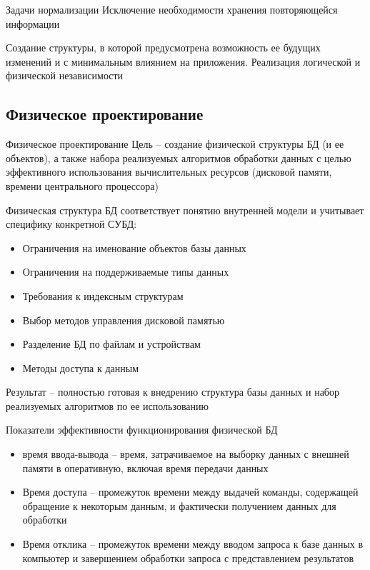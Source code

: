 \documentclass[12pt]{article}
\begin{document}
\begin{nota}{Задачи нормализации}
    Исключение необходимости хранения повторяющейся информации 

    Создание структуры, в которой предусмотрена возможность ее будущих изменений и с минимальным влиянием на приложения. Реализация логической и физической независимости 
\end{nota}

\newpage 

\subsection{Физическое проектирование}

\begin{defin}{Физическое проектирование}
    Цель -- создание физической структуры БД (и ее объектов), а также набора реализуемых алгоритмов обработки данных с целью эффективного использования вычислительных ресурсов (дисковой памяти, времени центрального процессора)

    Физическая структура БД соответствует понятию внутренней модели и учитывает специфику конкретной СУБД: 

    \begin{itemize}
        \item Ограничения на именование объектов базы данных 
        \item Ограничения на поддерживаемые типы данных 
        \item Требования к индексным структурам 
        \item Выбор методов управления дисковой памятью 
        \item Разделение БД по файлам и устройствам 
        \item Методы доступа к данным 
    \end{itemize}

    Результат -- полностью готовая к внедрению структура базы данных и набор реализуемых алгоритмов по ее использованию 
\end{defin}

\begin{nota}{Показатели эффективности функционирования физической БД}
    \begin{itemize}
        \item время ввода-вывода -- время, затрачиваемое на выборку данных с внешней памяти в оперативную, включая время передачи данных 
        \item Время доступа -- промежуток времени между выдачей команды, содержащей обращение к некоторым данным, и фактически получением данных для обработки 
        \item Время отклика -- промежуток времени между вводом запроса к базе данных в компьютер и завершением обработки запроса с представлением результатов 
    \end{itemize}
\end{nota}
\end{document}
